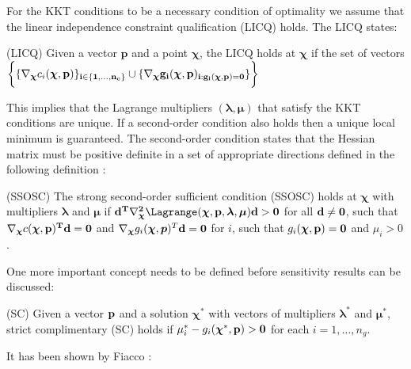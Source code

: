 \par
For the KKT conditions to be a necessary condition of optimality we assume that the linear independence constraint qualification (LICQ) holds.
The LICQ states:
\begin{definition}{(LICQ)}
	Given a vector $\boldsymbol{p}$ and a point $\boldsymbol{\chi}$, the LICQ holds at $\boldsymbol{\chi}$ if the set of vectors $\bigg\{\{\nabla_{\boldsymbol{\chi}}c_i(\boldsymbol{\chi},\bf{p})\}_{i\in\{1,\ldots,n_c\}}\cup\{\nabla_{\boldsymbol{\chi}}g_i(\boldsymbol{\chi},\bf{p})_{i:g_i(\boldsymbol{\chi},\boldsymbol{p})=0}\}\bigg\}$
\end{definition}
This implies that the Lagrange multipliers $(\boldsymbol{\lambda},\boldsymbol{\mu})$ that satisfy the KKT conditions are unique.
If a second-order condition also holds then a unique local minimum is guaranteed.
The second-order condition states that the Hessian matrix must be positive definite in a set of appropriate directions defined in the following definition \cite{economic}:
\begin{definition}{(SSOSC)}
	The strong second-order sufficient condition (SSOSC) holds at $\boldsymbol{\chi}$ with multipliers $\boldsymbol{\lambda}$ and $\boldsymbol{\mu}$ if $\bf{d}^T\nabla_{\boldsymbol{\chi}}^2\Lagrange(\boldsymbol{\chi},\bf{p},\boldsymbol{\lambda},\boldsymbol{\mu})\bf{d}>0$ for all $\bf{d}\neq 0$, such that $\nabla_{\boldsymbol{\chi}}c(\boldsymbol{\chi},\bf{p})^T\boldsymbol{d}=0$ and $\nabla_{\boldsymbol{\chi}}g_i(\boldsymbol{\chi},\boldsymbol{p})^T\bf{d}=0$ for $i$, such that $g_i(\boldsymbol{\chi},\bf{p})=0$ and $\mu_i>0$.
\end{definition}
\par
One more important concept needs to be defined before sensitivity results can be discussed:
\begin{definition}{(SC)}
	Given a vector $\bf{p}$ and a solution $\boldsymbol{\chi}^*$ with vectors of multipliers $\boldsymbol{\lambda}^*$ and $\boldsymbol{\mu}^*$, strict complimentary (SC) holds if $\mu_i^*-g_i(\boldsymbol{\chi}^*,\bf{p})>0$ for each $i=1,\ldots,n_g$.
\end{definition}
\par
It has been shown by Fiacco \cite{sensitivity}:
